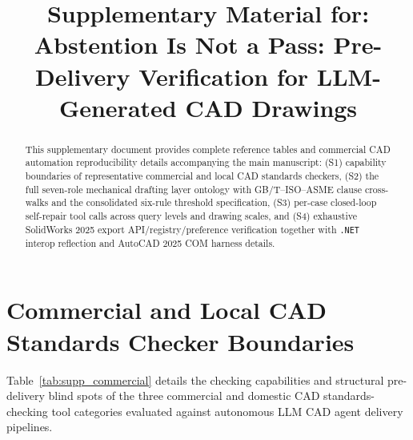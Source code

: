 \documentclass[nocopyright,nolists,upint,varvw,hyphenate]{asmejour}
\begin{document}

\title{Supplementary Material for: Abstention Is Not a Pass: Pre-Delivery Verification for LLM-Generated CAD Drawings}


\begin{abstract}
This supplementary document provides complete reference tables and commercial CAD automation reproducibility details accompanying the main manuscript: (S1) capability boundaries of representative commercial and local CAD standards checkers, (S2) the full seven-role mechanical drafting layer ontology with GB/T--ISO--ASME clause cross-walks and the consolidated six-rule threshold specification, (S3) per-case closed-loop self-repair tool calls across query levels and drawing scales, and (S4) exhaustive SolidWorks 2025 export API/registry/preference verification together with {\upshape\texttt{.NET}} interop reflection and AutoCAD 2025 COM harness details.
\end{abstract}

\date{}

\AbstractSep{8mm}
\maketitle

\section{Commercial and Local CAD Standards Checker Boundaries}\label{sec:supp_commercial}

Table~\ref{tab:supp_commercial} details the checking capabilities and structural pre-delivery blind spots of the three commercial and domestic CAD standards-checking tool categories evaluated against autonomous LLM CAD agent delivery pipelines.
\end{document}
